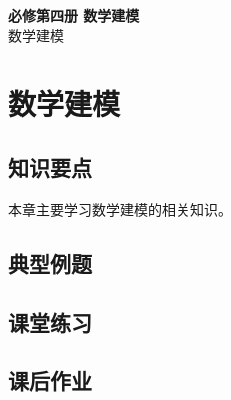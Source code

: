 \documentclass[12pt,a4paper]{article}
\begin{document}
\begin{center}
\LARGE\textbf{必修第四册 数学建模} \\[0.5em]
\large 数学建模
\end{center}

\tableofcontents
\newpage

\section{数学建模}

\subsection{知识要点}
本章主要学习数学建模的相关知识。

\subsection{典型例题}

\subsection{课堂练习}

\subsection{课后作业}
\end{document}
